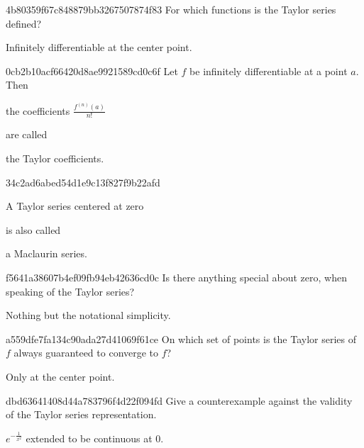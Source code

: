 \begin{note}{4b80359f67c848879bb3267507874f83}
    For which functions is the Taylor series defined?

    \begin{cloze}{1}
        Infinitely differentiable at the center point.
    \end{cloze}
\end{note}

\begin{note}{0cb2b10acf66420d8ae9921589cd0c6f}
    Let \({ f }\) be infinitely differentiable at a point \({ a }\).
    Then \begin{icloze}{2}the coefficients \({ \frac{f^{(n)}(a)}{n!} }\)\end{icloze} are called \begin{icloze}{1}the Taylor coefficients.\end{icloze}
\end{note}

\begin{note}{34c2ad6abed54d1e9c13f827f9b22afd}
    \begin{icloze}{2}A Taylor series centered at zero\end{icloze} is also called \begin{icloze}{1}a Maclaurin series.\end{icloze}
\end{note}

\begin{note}{f5641a38607b4ef09fb94eb42636cd0c}
    Is there anything special about zero, when speaking of the Taylor series?

    \begin{cloze}{1}
        Nothing but the notational simplicity.
    \end{cloze}
\end{note}

\begin{note}{a559dfe7fa134c90ada27d41069f61ce}
    On which set of points is the Taylor series of \({ f }\) always guaranteed to converge to \({ f }\)?

    \begin{cloze}{1}
        Only at the center point.
    \end{cloze}
\end{note}

\begin{note}{dbd63641408d44a783796f4d22f094fd}
    Give a counterexample against the validity of the Taylor series representation.

    \begin{cloze}{1}
        \({ e^{-\frac{1}{x^2}} }\) extended to be continuous at \({ 0 }\).
    \end{cloze}
\end{note}


